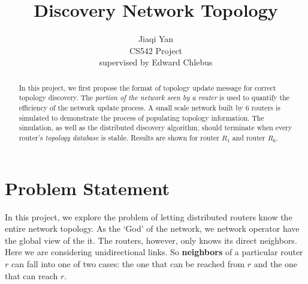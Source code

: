 \documentclass[12pt]{article}  %
\title{Discovery Network Topology}
\author{Jiaqi Yan\\
CS542 Project\\
supervised by
Edward Chlebus}
\theoremstyle{definition}
\theoremstyle{remark}
\begin{document}
\maketitle

\begin{abstract}
In this project, we first propose the format of topology update message for correct topology discovery.
The \textit{portion of the network seen by a router} is used to quantify the efficiency of the network update process.
A small scale network built by 6 routers is simulated to demonstrate the process of populating topology information.
The simulation, as well as the distributed discovery algorithm, should terminate when every router's \textit{topology database} is stable.
Results are shown for router $R_1$ and router $R_6$.
\end{abstract}

\newpage                     %
\tableofcontents

\newpage                     %
\section{Problem Statement}\label{s:intro}
%

In this project, we explore the problem of letting distributed routers know the entire network topology.
As the `God' of the network, we network operator have the global view of the it.
The routers, however, only knows its direct neighbors. 
Here we are considering unidirectional links.
So \textbf{neighbors} of a particular router $r$ can fall into one of two cases: the one that can be reached from $r$ and the one that can reach $r$.
\end{document}
